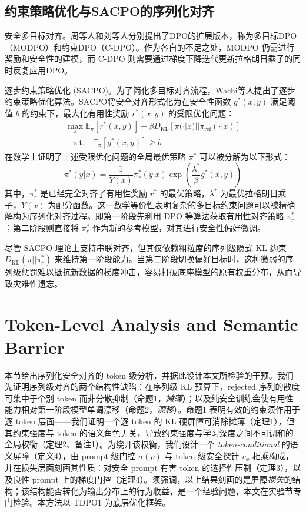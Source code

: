 \documentclass[lettersize,journal]{IEEEtran}
\begin{document}
\subsection{约束策略优化与SACPO的序列化对齐}
安全多目标对齐。周等人\cite{zhou2024beyond}和刘等人\cite{liu2024enhancing}分别提出了DPO的扩展版本，称为多目标DPO（MODPO）和约束DPO（C-DPO）。作为各自的不足之处，MODPO 仍需进行奖励和安全性的建模，而 C-DPO 则需要通过梯度下降迭代更新拉格朗日乘子的同时反复应用DPO。

逐步约束策略优化 (SACPO)\cite{wachi2024stepwise}。为了简化多目标对齐流程，Wachi等人提出了逐步约束策略优化算法。SACPO将安全对齐形式化为在安全性函数 $g^*(x, y)$ 满足阈值 $b$ 的约束下，最大化有用性奖励 $r^*(x, y)$ 的受限优化问题：
\begin{equation}
\begin{aligned}
    \max_{\pi} \mathbb{E}_{\pi}[r^*(x, y)] - \beta D_{\text{KL}}[\pi(\cdot|x) || \pi_{\text{ref}}(\cdot|x)]  \\ \quad \text{s.t.} \quad \mathbb{E}_{\pi}[g^*(x, y)] \ge b
\end{aligned}
\end{equation}
在数学上证明了上述受限优化问题的全局最优策略 $\pi^*$ 可以被分解为以下形式：
\begin{equation}
    \pi^*(y|x) = \frac{1}{Y(x)} \pi^*_r(y|x) \exp\left(\frac{\lambda^*}{\beta} g^*(x,y)\right)
\end{equation}
其中，$\pi^*_r$ 是已经完全对齐了有用性奖励 $r^*$ 的最优策略，$\lambda^*$ 为最优拉格朗日乘子，$Y(x)$ 为配分函数。这一数学等价性表明复杂的多目标约束问题可以被精确解构为序列化对齐过程。即第一阶段先利用 DPO 等算法获取有用性对齐策略 $\pi^*_r$；第二阶段则直接将 $\pi^*_r$ 作为新的参考模型，对其进行安全性偏好微调。

尽管 SACPO 理论上支持串联对齐，但其仅依赖粗粒度的序列级隐式 KL 约束 $D_{\text{KL}}(\pi || \pi^*_r)$ 来维持第一阶段能力。当第二阶段切换偏好目标时，这种微弱的序列级惩罚难以抵抗新数据的梯度冲击，容易打破底座模型的原有权重分布，从而导致灾难性遗忘。

\section{Token-Level Analysis and Semantic Barrier}
本节给出序列化安全对齐的 token 级分析，并据此设计本文所检验的干预。我们先证明序列级对齐的两个结构性缺陷：在序列级 KL 预算下，rejected 序列的散度可集中于个别 token 而非分散抑制（命题1，\textit{摊薄}）；以及纯安全训练会使有用性能力相对第一阶段模型单调漂移（命题2，\textit{漂移}）。命题1 表明有效的约束须作用于逐 token 层面——我们证明一个逐 token 的 KL 硬屏障可消除摊薄（定理1），但其约束强度与 token 的语义角色无关，导致约束强度与学习深度之间不可调和的全局权衡（定理2、备注1）。为绕开该权衡，我们设计一个 \textit{token-conditional} 的语义屏障（定义4），由 prompt 级门控 $\sigma(\rho)$ 与 token 级安全探针 $v_\phi$ 相乘构成，并在损失层面刻画其性质：对安全 prompt 有害 token 的选择性压制（定理3），以及良性 prompt 上的梯度门控（定理4）。须强调，以上结果刻画的是屏障\textit{损失}的结构；该结构能否转化为输出分布上的行为收益，是一个经验问题，本文在实验节专门检验。本方法以 TDPO1\cite{zeng2024token} 为底层优化框架。
\end{document}

